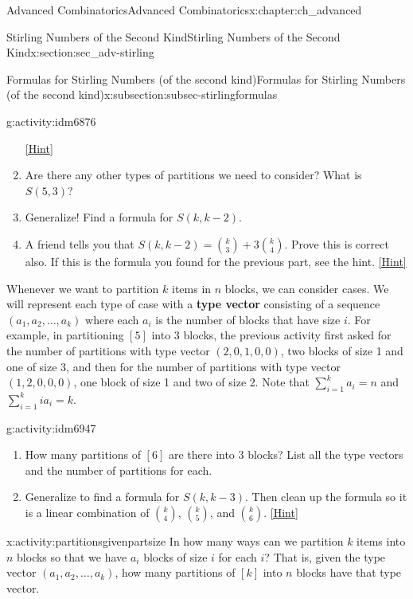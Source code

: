 \documentclass[oneside,10pt,]{book}
\newcommand{\terminology}[1]{\textbf{#1}}
\numberwithin{equation}{chapter}
\begin{document}
\begin{chapterptx}{Advanced Combinatorics}{}{Advanced Combinatorics}{}{}{x:chapter:ch_advanced}
\begin{sectionptx}{Stirling Numbers of the Second Kind}{}{Stirling Numbers of the Second Kind}{}{}{x:section:sec_adv-stirling}
\begin{subsectionptx}{Formulas for Stirling Numbers (of the second kind)}{}{Formulas for Stirling Numbers (of the second kind)}{}{}{x:subsection:subsec-stirlingformulas}
\begin{activity}{}{g:activity:idm6876}
\begin{enumerate}[font=\bfseries,label=(\alph*),ref=\alph*]
\space\hspace*{0pt}\hfill{\tiny\hyperlink{g:hint:idm6891-back}{[Hint]}}\item{}Are there any other types of partitions we need to consider?  What is \(S(5,3)\)?%
\item{}Generalize! Find a formula for \(S(k, k-2)\).%
\item{}A friend tells you that \(S(k,k-2) = \binom{k}{3} + 3 \binom{k}{4}\).  Prove this is correct also.  If this is the formula you found for the previous part, see the hint.%
\space\hspace*{0pt}\hfill{\tiny\hyperlink{g:hint:idm6922-back}{[Hint]}}\end{enumerate}
\end{activity}
 Whenever we want to partition \(k\) items in \(n\) blocks, we can consider cases.  We will represent each type of case with a \terminology{type vector} consisting of a sequence \((a_1, a_2, \ldots, a_k)\) where each \(a_i\) is the number of blocks that have size \(i\).  For example, in partitioning \([5]\) into 3 blocks, the previous activity first asked for the number of partitions with type vector \((2,0,1,0,0)\), two blocks of size 1 and one of size 3, and then for the number of partitions with type vector \((1,2,0,0,0)\), one block of size 1 and two of size 2.  Note that \(\sum_{i=1}^k a_i = n\) and \(\sum_{i=1}^k ia_i = k\).%
\begin{activity}{}{g:activity:idm6947}%
\begin{enumerate}[font=\bfseries,label=(\alph*),ref=\alph*]
\item{}How many partitions of \([6]\) are there into 3 blocks?  List all the type vectors and the number of partitions for each.%
\item{}Generalize to find a formula for \(S(k,k-3)\).  Then clean up the formula so it is a linear combination of \(\binom{k}{4}\), \(\binom{k}{5}\), and \(\binom{k}{6}\).%
\space\hspace*{0pt}\hfill{\tiny\hyperlink{g:hint:idm6959-back}{[Hint]}}\end{enumerate}
\end{activity}
\begin{activity}{}{x:activity:partitionsgivenpartsize}%
In how many ways can we partition \(k\) items into \(n\) blocks so that we have \(a_i\) blocks of size \(i\) for each \(i\)? That is, given the type vector \((a_1, a_2, \ldots, a_k)\), how many partitions of \([k]\) into \(n\) blocks have that type vector.%

\end{activity}
\end{subsectionptx}
\end{sectionptx}
\end{chapterptx}
\end{document}
